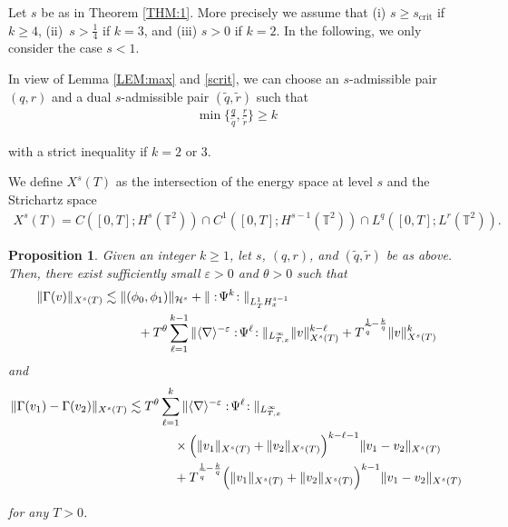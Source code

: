 \documentclass[letterpaper, 11pt,  reqno]{amsart}
\newtheorem{proposition}[theorem]{Proposition}
\newcommand{\1}{\hspace{0.5mm}\text{I}\hspace{0.5mm}}
\newcommand{\noi}{\noindent}
\newcommand{\T}{\mathbb{T}}
\newcommand{\nb}{\nabla}
\newcommand{\eps}{\varepsilon}
\newcommand{\G}{\Gamma}
\newcommand{\wt}{\widetilde}
\renewcommand{\l}{\ell}
\newcommand{\les}{\lesssim}
\newcommand{\jb}[1]
{\langle #1 \rangle}
\renewcommand{\H}{\mathcal{H}}
\numberwithin{equation}{section}
\numberwithin{theorem}{section}
\begin{document}
\noi 
Let  $s $ be as in Theorem \ref{THM:1}. 
More precisely we assume that  
(i) $ s\geq s_\text{crit} $ if $k \ge 4$, 
(ii)~$ s > \frac14$ if $k=3$, and 
(iii) $s>0$ if $k=2$. 
 In the following, we only consider the case $s < 1$.


In view of Lemma \ref{LEM:max} and \eqref{scrit}, 
we can choose an $s$-admissible pair $(q, r)$ and a dual $s$-admissible pair $(\wt q, \wt r)$
such that 
\begin{align*}
\min\Big\{  \frac{q}{\wt q} ,\frac{r}{\wt r} \Big\} \ge k 
\end{align*}

\noi
with a strict inequality if $k=2$ or $3$.  



We define $X^s(T)$ as the intersection of the energy space at level $s$ and the Strichartz space
\begin{align*}
 X^s(T) = C([0,T];H^s(\T^2))\cap C^1([0,T]; H^{s-1}(\T^2))\cap L^q([0, T]; L^r(\T^2)). 
\end{align*}



\begin{proposition}\label{PROP:nonlin} 
Given an integer $k \geq 1$, let $s$, $(q, r)$, and $(\wt q, \wt r)$ be as above.
Then,  there exist sufficiently small $\eps >0$ and $\theta > 0$ such that 
\begin{align} 
\| \G(v) \|_{X^s(T)} 
& \les
\|(\phi_0, \phi_1)\|_{\H^s}
+ \| :\!\Psi^k\!: \|_{L^1_TH^{s-1}_x} \notag\\
& \hphantom{XXX}+   T^\theta \sum_{\l=1}^{k-1} \|\jb{\nb}^{-\eps} :\!\Psi^\l\!: \|_{L^\infty_{T, x}} 
\| v \|_{X^s(T)}^{k-\l}  
 +  T^{\frac{1}{\wt q}-\frac kq} 
\| v \|_{X^s(T)}^k   
\label{J3a}
\end{align}
and 
\begin{align}
\| \G(v_1)-\G(v_2)  \|_{X^s(T)} & \les  
T^\theta \sum_{\l=1}^k \|\jb{\nb}^{-\eps} :\!\Psi^\l\!: \|_{L^\infty_{T, x}} \notag\\
& \hphantom{XXXX}
\times
\Big( \| v_1 \|_{X^s(T)}  + \| v_2 \|_{X^s(T)}\Big)^{k-\l-1}  
\| v_1 - v_2 \|_{X^s(T)}   \notag\\ 
  & \hphantom{XXXX}
  +  T^{\frac{1}{\wt q}-\frac k q} 
\Big( \| v_1 \|_{X^s(T)}+ \| v_2 \|_{X^s(T)}\Big)^{k-1} \| v_1-v_2 \|_{X^s(T)}
\label{J3b}
\end{align}

\noi
for any $T > 0$.

\end{proposition} 
\end{document}
